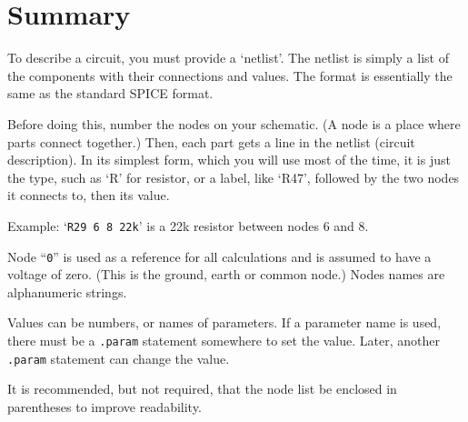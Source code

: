 %
%
%
%
\section{Summary}

 To describe a circuit, you must provide a `netlist'.  The netlist is simply
a list of the components with their connections and values.  The format is
essentially the same as the standard SPICE format.

Before doing this, number the nodes on your schematic.  (A node is a place
where parts connect together.)  Then, each part gets a line in the netlist
(circuit description).  In its simplest form, which you will use most of the
time, it is just the type, such as `R' for resistor, or a label, like `R47',
followed by the two nodes it connects to, then its value.

Example:  `{\tt R29 6 8 22k}' is a 22k resistor between nodes 6 and 8.

Node ``{\tt 0}'' is used as a reference for all calculations and is
assumed to have a voltage of zero.  (This is the ground, earth or
common node.)  Nodes names are alphanumeric strings.

Values can be numbers, or names of parameters.  If a parameter name is
used, there must be a {\tt .param} statement somewhere to set the
value.  Later, another {\tt .param} statement can change the value.

It is recommended, but not required, that the node list be enclosed in
parentheses to improve readability.

